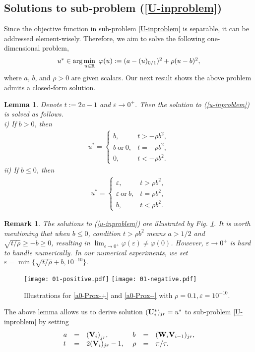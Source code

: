 \documentclass[journal]{IEEEtran}
\newtheorem{lemma}{Lemma}
\newtheorem{remark}{Remark}
\newcommand{\ba}{\begin{array}}
\newcommand{\ea}{\end{array}}
\newcommand{\be}{\begin{equation}}
\newcommand{\ee}{\end{equation}}
\def\R{\mathbb{R}}
\def\U{{\bf U}}
\def\V{{\bf V}}
\def\W{{\bf W}}
\begin{document}
\subsection{Solutions to sub-problem  (\ref{U-inproblem})}
Since the objective function in sub-problem \eqref{U-inproblem} is separable, it can be addressed element-wisely. Therefore, we aim to solve the following one-dimensional problem,
\be\ba{cl}\label{u-inproblem}
u^*\in {\rm arg}\min\limits_{u\in \R}~\varphi (u):= (a- (u)_{0/1})^2+ \rho  (u-b)^2,
\ea\ee
where $a$, $b$, and $\rho >0$ are given scalars. Our next result shows the above problem admits a closed-form solution.
\begin{lemma} \label{u_insolution}Denote $t:=2a-1 $ and $\varepsilon\to0^+$.  Then the solution to  (\ref{u-inproblem}) is solved as follows.\\
i) If $b>0$, then
\begin{eqnarray}
\label{a0-Prox-+}
u^*=
\begin{cases}
b,&t>-\rho b^2,\\
b~\text{or}~0,&t=-\rho b^2,\\
0, &t<-\rho b^2.
\end{cases}
\end{eqnarray}
ii) If $b\leq 0$, then
\begin{eqnarray}
\label{a0-Prox--}
u^*=
\begin{cases}
\varepsilon,&t> \rho b^2,\\
\varepsilon~\text{or}~b,&t= \rho b^2,\\
b, &t<\rho b^2.
\end{cases}
\end{eqnarray}

\end{lemma}

\begin{remark}The solutions to (\ref{u-inproblem}) are illustrated by Fig. \ref{01-solutions}. It is worth mentioning that when $b\leq0$, condition $t>\rho b^2$   means $a>1/2$ and $\sqrt{t/\rho} \geq -b\geq0$, resulting in $\lim_{\epsilon \to0^+}\varphi(\varepsilon) \neq \varphi(0)$. However,  $\varepsilon \to0^+$ is hard to handle numerically. In our numerical experiments, we set $\varepsilon=\min\{\sqrt{t/\rho}+b,10^{-10}\}.$
\end{remark}
\begin{figure}[!th]
\centering
\texttt{[image: 01-positive.pdf]}
\texttt{[image: 01-negative.pdf]}
  \caption{Illustrations for \eqref{a0-Prox-+} and \eqref{a0-Prox--} with $ \rho=0.1, \varepsilon=10^{-10}$.}\label{01-solutions}
\end{figure}
The above lemma allows us to derive solution $(\U_i^*)_{jr}=u^*$ to sub-problem \eqref{U-inproblem}  by setting
\be \label{U-inproblem-*}
\ba{lllllll}
a&=&{(\V_i)}_{jr},~ &b&=&(\W_{i}\V_{i-1})_{jr},\\
t&=&2(\V_i)_{jr}-1,~ &\rho&=&\pi/\tau.
\ea\ee
\end{document}
